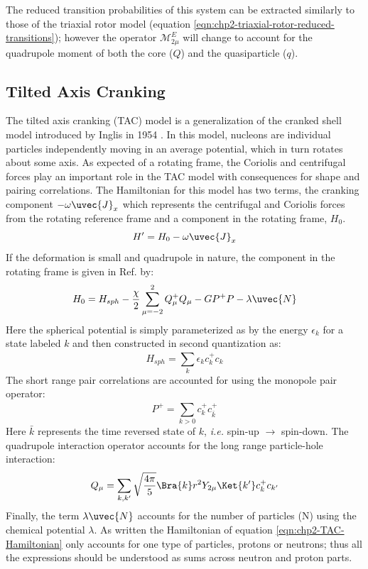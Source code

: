The reduced transition probabilities of this system can be extracted similarly to those of the triaxial rotor model (equation \ref{eqn:chp2-triaxial-rotor-reduced-transitions}); however the operator $\mathcal{M}^E_{2\mu}$ will change to account for the quadrupole moment of both the core ($Q$) and the quasiparticle ($q$).

\subsection{Tilted Axis Cranking}
\label{sec:models-tac}
The tilted axis cranking (TAC) model \cite{frauendorfTAC} is a generalization of the cranked shell model introduced by Inglis in 1954 \cite{crankedShellModel}. In this model, nucleons are individual particles independently moving in an average potential, which in turn rotates about some axis. As expected of a rotating frame, the Coriolis and centrifugal forces play an important role in the TAC model with consequences for shape and pairing correlations. The Hamiltonian for this model has two terms, the cranking component $-\omega\uvec{J}_x$ which represents the centrifugal and Coriolis forces from the rotating reference frame and a component in the rotating frame, $H_0$.
\begin{equation}
\label{eqn:chp2-TAC-Hamiltonian}
H'=H_0-\omega\uvec{J}_x
\end{equation}
If the deformation is small and quadrupole in nature, the component in the rotating frame is given in Ref. \cite{frauendorfTAC} by:
\begin{equation}
\label{eqn:chp2-TAC-invar-Hamiltonian}
H_0=H_{sph}-\frac{\chi}{2}\sum\limits_{\mu=-2}^{2}Q_{\mu}^+Q_{\mu} - GP^+P-\lambda\uvec{N}
\end{equation}
Here the spherical potential is simply parameterized as by the energy $\epsilon_k$ for a state labeled $k$ and then constructed in second quantization as:
\begin{equation}
\label{eqn:chp2-TAC-spherical}
H_{sph}=\sum\limits_{k}^{}\epsilon_kc^+_kc_k
\end{equation}
The short range pair correlations are accounted for using the monopole pair operator:
\begin{equation}
\label{eqn:chp2-TAC-pairing}
P^+=\sum\limits_{k>0}^{}c^+_kc^+_{\bar{k}}
\end{equation}
Here $\bar{k}$ represents the time reversed state of $k$, \emph{i.e.} spin-up $\rightarrow$ spin-down. The quadrupole interaction operator accounts for the long range particle-hole interaction:
\begin{equation}
\label{eqn:chp2-TAC-quad}
Q_{\mu}=\sum\limits_{k,k'}^{}\sqrt{\frac{4\pi}{5}}\Bra{k}r^2Y_{2\mu}\Ket{k'}c^+_kc_{k'}
\end{equation}
Finally, the term $\lambda\uvec{N}$ accounts for the number of particles (N) using the chemical potential $\lambda$. As written the Hamiltonian of equation \ref{eqn:chp2-TAC-Hamiltonian} only accounts for one type of particles, protons or neutrons; thus all the expressions should be understood as sums across neutron and proton parts.


